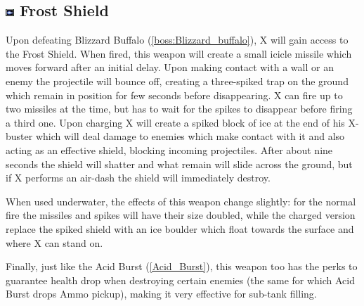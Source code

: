 \subsection{\includegraphics[width=12px, height=10px]{figures/X3/weapons/F_shield.jpg} Frost Shield}\label{Frost_Shield}
Upon defeating Blizzard Buffalo (\ref{boss:Blizzard_buffalo}), X will gain access to the Frost Shield. When fired, this weapon will create a small icicle missile which moves forward after an initial delay. Upon making contact with a wall or an enemy the projectile will bounce off, creating a three-spiked trap on the ground which remain in position for few seconds before disappearing. X can fire up to two missiles at the time, but has to wait for the spikes to disappear before firing a third one. Upon charging X will create a spiked block of ice at the end of his X-buster which will deal damage to enemies which make contact with it and also acting as an effective shield, blocking incoming projectiles. After about nine seconds the shield will shatter and what remain will slide across the ground, but if X performs an air-dash the shield will immediately destroy.

When used underwater, the effects of this weapon change slightly: for the normal fire the missiles and spikes will have their size doubled, while the charged version replace the spiked shield with an ice boulder which float towards the surface and where X can stand on.

Finally, just like the Acid Burst (\ref{Acid_Burst}), this weapon too has the perks to guarantee health drop when destroying certain enemies (the same for which Acid Burst drops Ammo pickup), making it very effective for sub-tank filling.

